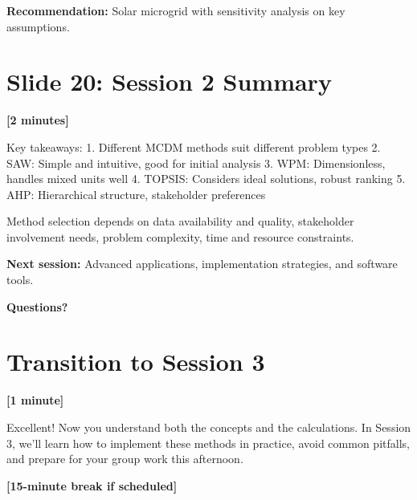 \documentclass[12pt]{article}
\begin{document}
\textcolor{emphasis}{\textbf{Recommendation:}} Solar microgrid with sensitivity analysis on key assumptions.

\section*{Slide 20: Session 2 Summary}
\textcolor{timing}{\textbf{[2 minutes]}}

Key takeaways:
1. Different MCDM methods suit different problem types
2. SAW: Simple and intuitive, good for initial analysis  
3. WPM: Dimensionless, handles mixed units well
4. TOPSIS: Considers ideal solutions, robust ranking
5. AHP: Hierarchical structure, stakeholder preferences

Method selection depends on data availability and quality, stakeholder involvement needs, problem complexity, time and resource constraints.

\textcolor{emphasis}{\textbf{Next session:}} Advanced applications, implementation strategies, and software tools.

\textcolor{emphasis}{\textbf{Questions?}}

\section*{Transition to Session 3}
\textcolor{timing}{\textbf{[1 minute]}}

Excellent! Now you understand both the concepts and the calculations. In Session 3, we'll learn how to implement these methods in practice, avoid common pitfalls, and prepare for your group work this afternoon.

\textcolor{speakernote}{\textbf{[15-minute break if scheduled]}}
\end{document}
